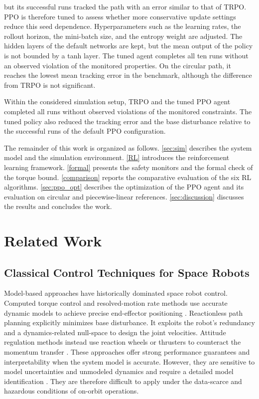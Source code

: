 \documentclass{ieeeaccess}
\begin{document}
\begin{itemize}
 but its successful runs tracked the path with an error similar to that of TRPO. PPO is therefore tuned
 to assess whether more conservative update settings reduce this seed dependence. Hyperparameters such
 as the learning rates, the rollout horizon, the mini-batch size, and the entropy weight are adjusted.
 The hidden layers of the default networks are kept, but the mean output of the policy is not bounded
 by a tanh layer. The tuned agent completes all ten runs without an observed violation of the monitored
 properties. On the circular path, it reaches the lowest mean tracking error in the benchmark, although
 the difference from TRPO is not significant.
\end{itemize}

Within the considered simulation setup, TRPO and the tuned PPO agent completed
all runs without observed violations of the monitored constraints. The tuned policy also reduced the
tracking error and the base disturbance relative to the successful runs of the default PPO
configuration.

The remainder of this work is organized as follows. \cref{sec:sim}
describes the system model and the simulation environment. \cref{RL} introduces the reinforcement
learning framework. \cref{formal} presents the safety monitors and the formal check of the torque bound.
\cref{comparison} reports the comparative evaluation of the six RL algorithms. \cref{sec:ppo_opt}
describes the optimization of the PPO agent and its evaluation on circular and piecewise-linear
references. \cref{sec:discussion} discusses the results and concludes the work.

\section{Related Work}

\subsection{Classical Control Techniques for Space Robots}
Model-based approaches have historically dominated space robot control. Computed torque control and
resolved-motion rate methods use accurate dynamic models to achieve precise end-effector positioning
\cite{b1}. Reactionless path planning explicitly minimizes base disturbance. It exploits the robot's
redundancy and a dynamics-related null-space to design the joint velocities. Attitude regulation methods
instead use reaction wheels or thrusters to counteract the momentum transfer \cite{b6,kaigom2011optimal}.
These approaches offer strong performance guarantees and interpretability when the system model is
accurate. However, they are sensitive to model uncertainties and unmodeled dynamics and require a
detailed model identification \cite{b12}. They are therefore difficult to apply under the data-scarce and hazardous
conditions of on-orbit operations.
\end{document}
